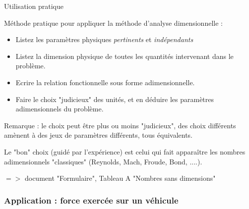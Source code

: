 \begin{frame}{Utilisation pratique}

\small
Méthode pratique pour appliquer la méthode d'analyse dimensionnelle :

\bigskip
\begin{itemize}
\item Listez les paramètres physiques {\em pertinents } et {\em indépendants }

\item Listez la dimension physique de toutes les quantités intervenant dans le problème.

\item Ecrire la relation fonctionnelle sous forme adimensionnelle.

\item Faire le choix "judicieux" des unités, et en déduire les paramètres adimensionnels du problème.

\end{itemize}

\bigskip

Remarque : le choix peut être plus ou moins "judicieux", des choix différents amènent à des jeux de paramètres différents, tous équivalents.  

\medskip 

Le "bon" choix (guidé par l'expérience) est celui qui fait apparaître les nombres adimensionnels "classiques" (Reynolds, Mach, Froude, Bond, ....).

\medskip 
$=>$ document "Formulaire", Tableau A "Nombres sans dimensions" 

\end{frame}




\subsubsection{Application : force exercée sur un véhicule}

